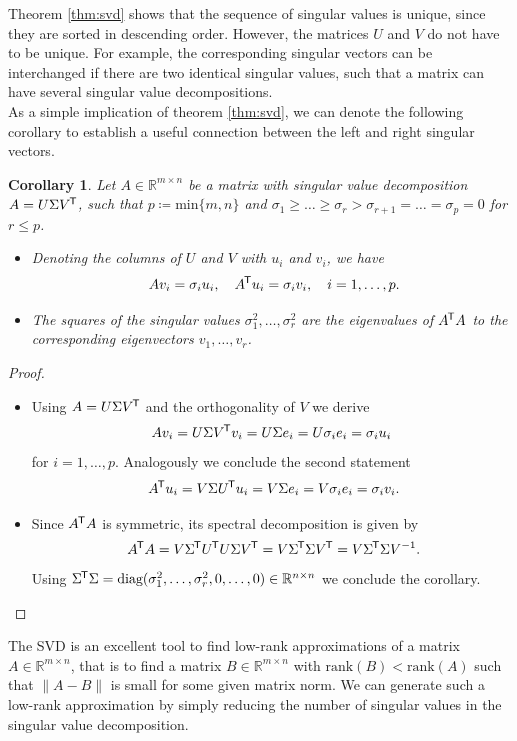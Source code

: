 \documentclass[11pt, a4paper]{article}
\newtheorem{corollary}[theorem]{Corollary}
\newcommand{\R}{\mathbb{R}}
\newcommand*{\tr}{^{\mkern-1.5mu\mathsf{T}}}
\begin{document}
Theorem \ref{thm:svd} shows that the sequence of singular values is unique, since they are sorted in descending order. However, the matrices $U$ and $V$ do not have to be unique. For example, the corresponding singular vectors can be interchanged if there are two identical singular values, such that a matrix can have several singular value decompositions. \\

As a simple implication of theorem \ref{thm:svd}, we can denote the following corollary to establish a useful connection between the left and right singular vectors. 

\begin{corollary} \label{cor:svd}
Let $A \in \R^{m \times n}$ be a matrix with singular value decomposition $A=U \Sigma V\tr $, such that $p \coloneq \text{min}\{m,n\}$ and $\sigma_1 \geq \dots \geq \sigma_r > \sigma_{r+1} = \dots = \sigma_p = 0$ for $r \leq p$.
\begin{itemize}
\item[1.] Denoting the columns of $U$ and $V$ with $u_i$ and $v_i$, we have
\[ A v_i = \sigma_i u_i, \quad A\tr  u_i = \sigma_i v_i, \quad i=1,\dots,p.\]
\item[2.] The squares of the singular values $\sigma_1^2, \dots, \sigma_r^2$ are the eigenvalues of $A\tr A$ to the corresponding eigenvectors $v_1, \dots, v_r$.
\end{itemize}
\end{corollary}

\begin{proof}
\ 
\begin{itemize}
\item[1.] Using $A=U \Sigma V\tr $ and the orthogonality of $V$ we derive
\[ Av_i = U \Sigma V\tr  v_i = U \Sigma e_i = U \sigma_i e_i = \sigma_i u_i \]
for $i=1, \dots, p$. Analogously we conclude the second statement
\[ A\tr  u_i = V \Sigma U\tr  u_i = V \Sigma e_i = V \sigma_i e_i = \sigma_i v_i. \]
\item[2.] Since $A\tr A$ is symmetric, its spectral decomposition is given by
\[ A\tr A = V \Sigma\tr  U\tr  U \Sigma V\tr  = V \Sigma\tr  \Sigma V\tr  = V \Sigma\tr  \Sigma V^{-1}. \]
Using $\Sigma\tr  \Sigma = \text{diag}(\sigma_1^2, \dots, \sigma_r^2, 0, \dots, 0) \in \R^{n \times n}$ we conclude the corollary. \qedhere
\end{itemize}
\end{proof}

The SVD is an excellent tool to find low-rank approximations of a matrix $A \in \R^{m \times n}$, that is to find a matrix $B \in \R^{m \times n}$ with $\text{rank}(B) < \text{rank}(A)$ such that $\|A -B\|$ is small for some given matrix norm. We can generate such a low-rank approximation by simply reducing the number of singular values in the singular value decomposition.
\end{document}
